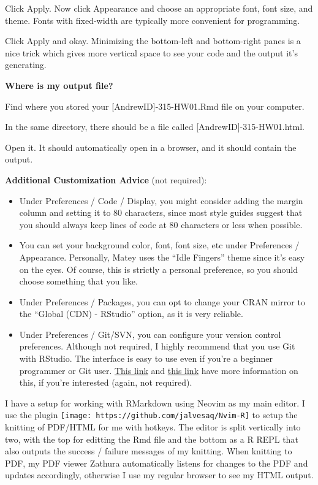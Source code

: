 \documentclass[]{article}
\providecommand{\tightlist}{%
  \setlength{\itemsep}{0pt}\setlength{\parskip}{0pt}}
\begin{document}
Click Apply. Now click Appearance and choose an appropriate font, font
size, and theme. Fonts with fixed-width are typically more convenient
for programming.

Click Apply and okay. Minimizing the bottom-left and bottom-right panes
is a nice trick which gives more vertical space to see your code and the
output it's generating.

\textbf{Where is my output file?}

Find where you stored your {[}AndrewID{]}-315-HW01.Rmd file on your
computer.

In the same directory, there should be a file called
{[}AndrewID{]}-315-HW01.html.

Open it. It should automatically open in a browser, and it should
contain the output.

\textbf{Additional Customization Advice} (not required):

\begin{itemize}
\tightlist
\item
  Under Preferences / Code / Display, you might consider adding the
  margin column and setting it to 80 characters, since most style guides
  suggest that you should always keep lines of code at 80 characters or
  less when possible.
\item
  You can set your background color, font, font size, etc under
  Preferences / Appearance. Personally, Matey uses the ``Idle Fingers''
  theme since it's easy on the eyes. Of course, this is strictly a
  personal preference, so you should choose something that you like.
\item
  Under Preferences / Packages, you can opt to change your CRAN mirror
  to the ``Global (CDN) - RStudio'' option, as it is very reliable.
\item
  Under Preferences / Git/SVN, you can configure your version control
  preferences. Although not required, I highly recommend that you use
  Git with RStudio. The interface is easy to use even if you're a
  beginner programmer or Git user.
  \href{https://support.rstudio.com/hc/en-us/articles/200532077-Version-Control-with-Git-and-SVN}{This
  link} and
  \href{https://jennybc.github.io/2014-05-12-ubc/ubc-r/session03_git.html}{this
  link} have more information on this, if you're interested (again, not
  required).
\end{itemize}

I have a setup for working with RMarkdown using Neovim as my main
editor. I use the plugin
\texttt{[image: https://github.com/jalvesaq/Nvim-R]} to setup the
knitting of PDF/HTML for me with hotkeys. The editor is split vertically
into two, with the top for editting the Rmd file and the bottom as a R
REPL that also outputs the success / failure messages of my knitting.
When knitting to PDF, my PDF viewer Zathura automatically listens for
changes to the PDF and updates accordingly, otherwise I use my regular
browser to see my HTML output.
\end{document}
